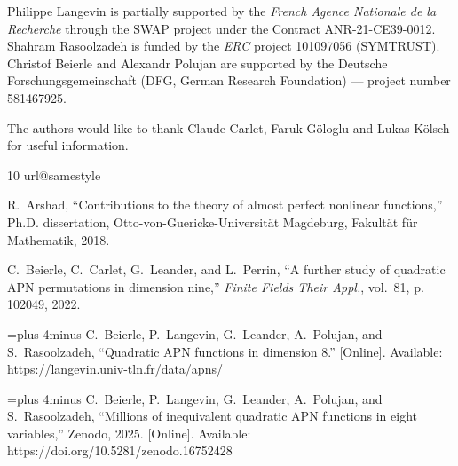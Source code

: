 \documentclass{amsart}[11pt]
\theoremstyle{plain}
\theoremstyle{definition}
\numberwithin{theorem}{section}
\numberwithin{equation}{section}
\numberwithin{table}{section}
\numberwithin{figure}{section}
\numberwithin{algorithm}{section}
\begin{document}
Philippe Langevin is partially supported by the \emph{French Agence Nationale de la Recherche} through the SWAP project under the Contract ANR-21-CE39-0012. Shahram Rasoolzadeh is funded by the \emph{ERC} project 101097056 (SYMTRUST). Christof Beierle and Alexandr Polujan are supported by the Deutsche Forschungsgemeinschaft (DFG, German Research Foundation) --- project number 581467925.

The authors would like to thank Claude Carlet, Faruk G{\"{o}}loglu and Lukas K\"olsch for useful information.

%
%

\begin{thebibliography}{10}
\providecommand{\url}[1]{#1}
\csname url@samestyle\endcsname
\providecommand{\newblock}{\relax}
\providecommand{\bibinfo}[2]{#2}
\providecommand{\BIBentrySTDinterwordspacing}{\spaceskip=0pt\relax}
\providecommand{\BIBentryALTinterwordstretchfactor}{4}
\providecommand{\BIBentryALTinterwordspacing}{\spaceskip=\fontdimen2\font plus
\BIBentryALTinterwordstretchfactor\fontdimen3\font minus \fontdimen4\font\relax}
\providecommand{\BIBforeignlanguage}[2]{{%
\expandafter\ifx\csname l@#1\endcsname\relax
\typeout{** WARNING: IEEEtranS.bst: No hyphenation pattern has been}%
\typeout{** loaded for the language `#1'. Using the pattern for}%
\typeout{** the default language instead.}%
\else
\language=\csname l@#1\endcsname
\fi
#2}}
\providecommand{\BIBdecl}{\relax}
\BIBdecl

R.~Arshad, ``Contributions to the theory of almost perfect nonlinear functions,'' Ph.D. dissertation, Otto-von-Guericke-Universität Magdeburg, Fakultät für Mathematik, 2018.

C.~Beierle, C.~Carlet, G.~Leander, and L.~Perrin, ``A further study of quadratic {APN} permutations in dimension nine,'' \emph{Finite Fields Their Appl.}, vol.~81, p. 102049, 2022.

\BIBentryALTinterwordspacing
C.~Beierle, P.~Langevin, G.~Leander, A.~Polujan, and S.~Rasoolzadeh, ``Quadratic {APN} functions in dimension 8.'' [Online]. Available: \url{https://langevin.univ-tln.fr/data/apns/}
\BIBentrySTDinterwordspacing

\BIBentryALTinterwordspacing
C.~Beierle, P.~Langevin, G.~Leander, A.~Polujan, and S.~Rasoolzadeh, ``Millions of inequivalent quadratic {APN} functions in eight variables,'' Zenodo, 2025. [Online]. Available: \url{https://doi.org/10.5281/zenodo.16752428}
\BIBentrySTDinterwordspacing


\end{thebibliography}
\end{document}
